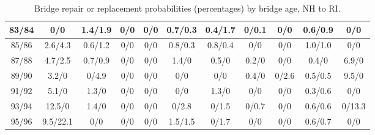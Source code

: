 \begin{table*}[htb]
\begin{tabular}{|c| c c c c c c c c c c |}
83/84&0/0& 1.4/1.9& 0/0& 0/0& 0.7/0.3& 0.4/1.7& 0/0.1& 0/0& 0.6/0.9& 0/0\\\hline
85/86&2.6/4.3& 0.6/1.2& 0/0& 0/0& 0.8/0.3& 0.8/0.4& 0/0& 0/0& 1.0/1.0& 0/0\\\hline
87/88&4.7/2.5& 0.7/0.9& 0/0& 0/0& 1.4/0& 0.5/0& 0.2/0& 0/0& 0.4/0& 6.9/0\\\hline
89/90&3.2/0& 0/4.9& 0/0& 0/0& 0/0& 0/0& 0.4/0& 0/2.6& 0.5/0.5& 9.5/0\\\hline
91/92&5.1/0& 1.3/0& 0/0& 0/0& 0/0& 1.3/0& 0/0& 0/0& 0.3/0.6& 0/0\\\hline
93/94&12.5/0& 1.4/0& 0/0& 0/0& 0/2.8& 0/1.5& 0/0.7& 0/0& 0.6/0.6& 0/13.3\\\hline
95/96&9.5/22.1& 0/0& 0/0& 0/0& 1.5/1.5& 0/1.7& 0/0& 0/0& 0.6/0.7& 0/0\\\hline

    \end{tabular}
    \caption{Bridge repair or replacement probabilities (percentages) by bridge age, NH to RI.}
    \label{table:states3}
\end{table*}
    

